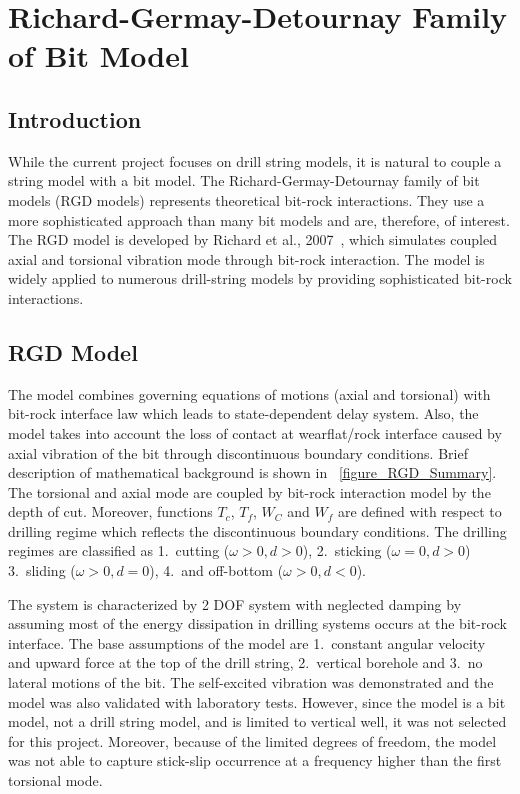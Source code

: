 \section{Richard-Germay-Detournay Family of Bit Model}
\label{ch:rgdmodels}

\subsection{Introduction}
While the current project focuses on drill string models, it is natural to couple a string model with a bit model. The Richard-Germay-Detournay family of bit models (RGD models) represents theoretical bit-rock interactions. They use a more sophisticated approach than many bit models and are, therefore, of interest. The RGD model is developed by Richard et al., 2007\ \cite{ref:richard2007a}, which simulates coupled axial and torsional vibration mode through bit-rock interaction. The model is widely applied to numerous drill-string models by providing sophisticated bit-rock interactions.
\subsection{RGD Model}
The model combines governing equations of motions (axial and torsional) with bit-rock interface law which leads to state-dependent delay system. Also, the model takes into account the loss of contact at wearflat/rock interface caused by axial vibration of the bit through discontinuous boundary conditions. Brief description of mathematical background is shown in \figurename~\ref{figure_RGD_Summary}. The torsional and axial mode are coupled by bit-rock interaction model by the depth of cut. Moreover, functions $T_c$, $T_f$, $W_C$ and $W_f$ are defined with respect to drilling regime which reflects the discontinuous boundary conditions. The drilling regimes are classified as 1.\ cutting ($\omega>0, d>0$), 2.\ sticking ($\omega=0, d>0$) 3.\ sliding ($\omega>0, d=0$), 4.\ and off-bottom ($\omega>0, d<0$). 

The system is characterized by 2 DOF system with neglected damping by assuming most of the energy dissipation in drilling systems occurs at the bit-rock interface. The base assumptions of the model are 1.\ constant angular velocity and upward force at the top of the drill string, 2.\ vertical borehole and 3.\ no lateral motions of the bit. The self-excited vibration was demonstrated and the model was also validated with laboratory tests. However, since the model is a bit model, not a drill string model, and is limited to vertical well, it was not selected for this project. Moreover, because of the limited degrees of freedom, the model was not able to capture stick-slip occurrence at a frequency higher than the first torsional mode. 


